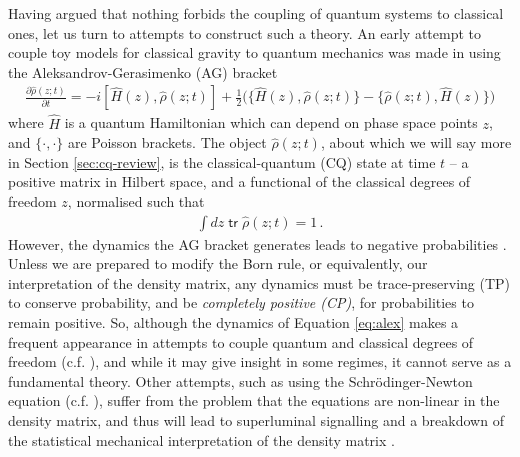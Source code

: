 \documentclass[aps,pra,showpacs,citeautoscript,amsmath,amssymb,floatfix,superscriptaddress,bbm, verbatim,amsfonts,changes,11pt,nofootinbib,longbibliography]{revtex4-2}
\newcommand{\tr}{\mathop{\mathsf{tr}}\nolimits}
\def\z{{z}}
\def\Hq{\hat{H}}
\renewcommand{\varrho}{\hat{\rho}}
\def\psiz{{\varrho(\z;t)}}
\def\PB{\}}
\begin{document}
Having argued that nothing forbids the coupling of quantum systems to classical ones, let us turn to attempts to construct such a theory.
An early attempt to couple toy models for classical gravity to quantum mechanics was made in  \cite{boucher1988semiclassical}
using the Aleksandrov-Gerasimenko (AG) bracket \cite{aleksandrov1981statistical,gerasimenko1982dynamical} 
\begin{align}
\frac{\partial \psiz}{\partial t}
=
-i[\Hq(\z),\psiz]+\frac{1}{2}\Big(\{\Hq(\z),\psiz\PB-\{\psiz,\Hq(\z)\PB\Big)
\label{eq:alex}
\end{align}
where $\hat{H}$ is a quantum Hamiltonian which can depend on phase space points $\z$, and $\{\cdot,\cdot\}$ are Poisson brackets. The object $\psiz$, about which we will say more in Section \ref{sec:cq-review}, is the classical-quantum (CQ) state at time $t$ -- a positive matrix in Hilbert space, and a functional of the classical degrees of freedom $\z$, normalised such that
\begin{align}
\int d\z \tr\psiz=1\,.
\label{eq:normalisation}
\end{align}
However, 
the dynamics the AG bracket generates leads to negative probabilities \cite{boucher1988semiclassical,diosi2000quantum}. Unless we are prepared to modify the Born rule, or equivalently, our interpretation of the density matrix, any dynamics must be trace-preserving (TP) to conserve probability, and be {\it completely positive (CP)}, for probabilities to remain positive. So, although the dynamics of Equation \eqref{eq:alex} makes a frequent appearance in attempts to couple quantum and classical degrees of freedom 
 \cite{anderson1995quantum,kapral1999mixed,kapral2006progress} (c.f.  \cite{prezhdo1997mixing}), and while it may give insight in some regimes, it cannot serve as a fundamental theory. 
Other attempts, such as using the Schr\"odinger-Newton equation \cite{diosi1987universal,penrose1998quantum} (c.f.  \cite{pitaevskii1961vortex,gross1961structure}), suffer from the problem that the equations are non-linear in the density matrix, and thus will lead to superluminal signalling \cite{gisin1989stochastic,gisin1990weinberg,polchinski1991weinberg} and a breakdown of the statistical mechanical interpretation of the density matrix \cite{matrix_foot}.\label{par:antag2}
\end{document}
